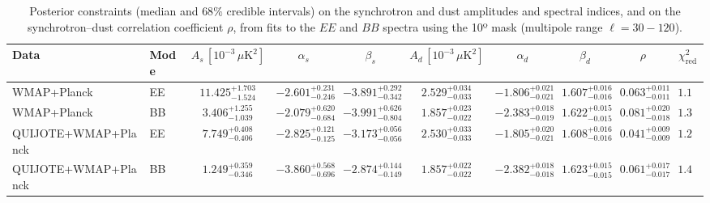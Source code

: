 \begin{table}[h]
\centering
\scriptsize
\setlength{\tabcolsep}{4pt}
\caption{Posterior constraints (median and $68\%$ credible intervals) on the synchrotron and dust amplitudes and spectral indices, and on the synchrotron--dust correlation coefficient $\rho$, from fits to the $EE$ and $BB$ spectra using the 10º mask (multipole range $\ell=30-120$).}
\label{tab:fit_cross_only_ell30-120}
\begin{tabular}{llcccccccc}
\toprule
Data & Mode & $A_s\,[10^{-3}\,\mu\mathrm{K}^2]$ & $\alpha_s$ & $\beta_s$ & $A_d\,[10^{-3}\,\mu\mathrm{K}^2]$ & $\alpha_d$ & $\beta_d$ & $\rho$ & $\chi^2_\mathrm{red}$ \\
\midrule
WMAP+Planck & EE & $11.425^{+1.703}_{-1.524}$ & $-2.601^{+0.231}_{-0.246}$ & $-3.891^{+0.292}_{-0.342}$ & $2.529^{+0.034}_{-0.033}$ & $-1.806^{+0.021}_{-0.021}$ & $1.607^{+0.016}_{-0.016}$ & $0.063^{+0.011}_{-0.011}$ & $1.19$ \\
WMAP+Planck & BB & $3.406^{+1.255}_{-1.039}$ & $-2.079^{+0.620}_{-0.684}$ & $-3.991^{+0.626}_{-0.804}$ & $1.857^{+0.023}_{-0.022}$ & $-2.383^{+0.018}_{-0.019}$ & $1.622^{+0.015}_{-0.015}$ & $0.081^{+0.020}_{-0.018}$ & $1.36$ \\
QUIJOTE+WMAP+Planck & EE & $7.749^{+0.408}_{-0.406}$ & $-2.825^{+0.121}_{-0.125}$ & $-3.173^{+0.056}_{-0.056}$ & $2.530^{+0.033}_{-0.033}$ & $-1.805^{+0.020}_{-0.021}$ & $1.608^{+0.016}_{-0.016}$ & $0.041^{+0.009}_{-0.009}$ & $1.25$ \\
QUIJOTE+WMAP+Planck & BB & $1.249^{+0.359}_{-0.346}$ & $-3.860^{+0.568}_{-0.696}$ & $-2.874^{+0.144}_{-0.149}$ & $1.857^{+0.022}_{-0.022}$ & $-2.382^{+0.018}_{-0.018}$ & $1.623^{+0.015}_{-0.015}$ & $0.061^{+0.017}_{-0.017}$ & $1.42$ \\
\bottomrule
\end{tabular}
\end{table}
